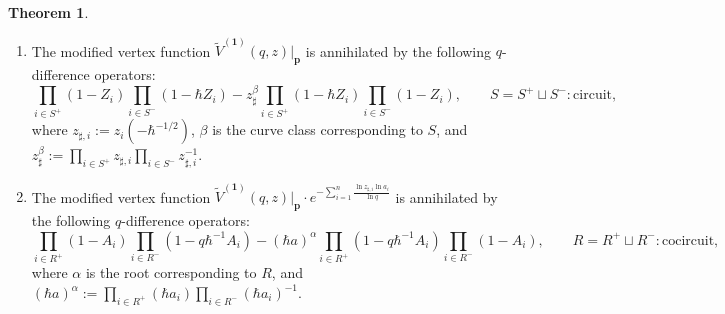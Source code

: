 \documentclass[10pt]{amsart}
\theoremstyle{definition}
\newcommand{\bp}{\mathbf{p}}
\newcommand{\bone}{\mathbf{1}}
\theoremstyle{definition}
\numberwithin{equation}{section}
\theoremstyle{Theorem}
\newtheorem{Theorem}[Definition]{Theorem}
\begin{document}
\begin{Theorem} \label{q-diff-eqn}
\begin{enumerate}[1)]

\item The modified vertex function $\widetilde V^{(\bone)} (q,z) \big|_\bp$ is annihilated by the following $q$-difference operators:
\begin{equation} \label{q-diff-Z}
\prod_{i\in S^+} ( 1 - Z_i ) \prod_{i\in S^-} ( 1 - \hbar  Z_i )  -  z_\sharp^\beta \prod_{i\in S^+} ( 1 - \hbar  Z_i ) \prod_{i\in S^-} ( 1 - Z_i ) , \qquad S = S^+ \sqcup S^- : \text{circuit},
\end{equation}
where $z_{\sharp, i}:= z_i (-\hbar^{-1/2})$, $\beta$ is the curve class corresponding to $S$, and $z_\sharp^\beta := \prod_{i\in S^+} z_{\sharp, i} \prod_{i\in S^-} z_{\sharp, i}^{-1}$.

\item The modified vertex function $\widetilde V^{(\bone)} (q,z) \big|_\bp \cdot e^{-\sum_{i=1}^n \frac{\ln z_{\sharp, i} \ln a_i}{\ln q} }$ is annihilated by the following $q$-difference operators:
\begin{equation} \label{q-diff-A}
\prod_{i\in R^+} (1- A_i) \prod_{i\in R^-} (1  - q\hbar^{-1} A_i ) - (\hbar a)^\alpha \prod_{i\in R^+} (1  - q\hbar^{-1} A_i ) \prod_{i\in R^-} (1  -  A_i ) , \qquad R = R^+ \sqcup R^- : \text{cocircuit},
\end{equation}
where $\alpha$ is the root corresponding to $R$, and $(\hbar a)^\alpha := \prod_{i\in R^+} (\hbar a_i) \prod_{i\in R^-} (\hbar a_i)^{-1}$.
\end{enumerate}

\end{Theorem}
\end{document}
